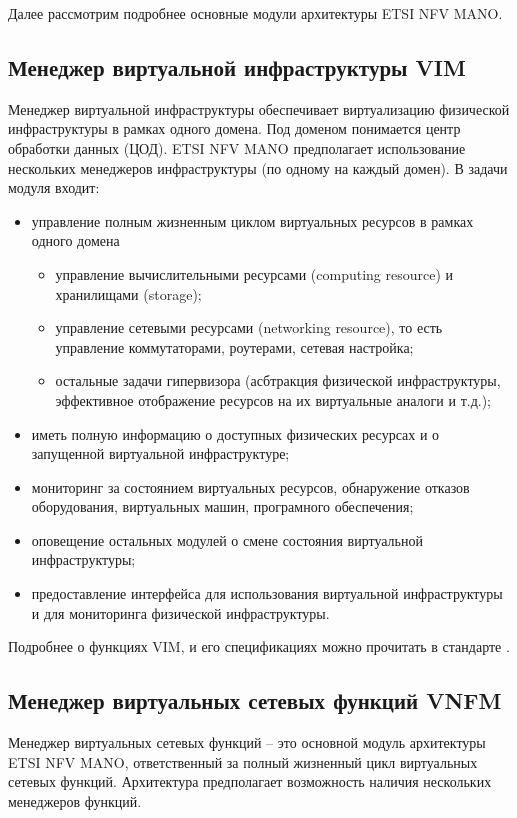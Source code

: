 \documentclass[oneside,final,14pt,a4paper]{extreport}
\begin{document}
Далее рассмотрим подробнее основные модули архитектуры ETSI NFV MANO.

\subsection{Менеджер виртуальной инфраструктуры VIM}
Менеджер виртуальной инфраструктуры обеспечивает виртуализацию физической инфраструктуры в рамках одного домена. Под доменом понимается центр обработки данных (ЦОД). ETSI NFV MANO предполагает использование нескольких менеджеров инфраструктуры (по одному на каждый домен). В задачи модуля входит:

\begin{itemize}
	\item управление полным жизненным циклом виртуальных ресурсов в рамках одного домена
	\begin{itemize}
		\item управление вычислительными ресурсами (computing resource) и хранилищами (storage);
		\item управление сетевыми ресурсами (networking resource), то есть управление коммутаторами, роутерами, сетевая настройка;
		\item остальные задачи гипервизора (асбтракция физической инфраструктуры, эффективное отображение ресурсов на их виртуальные аналоги и т.д.);
	\end{itemize}
	\item иметь полную информацию о доступных физических ресурсах и о запущенной виртуальной инфраструктуре;
	\item мониторинг за состоянием виртуальных ресурсов, обнаружение отказов оборудования, виртуальных машин, програмного обеспечения;
	\item оповещение остальных модулей о смене состояния виртуальной инфраструктуры;
	\item предоставление интерфейса для использования виртуальной инфраструктуры и для мониторинга физической инфраструктуры.
\end{itemize}

Подробнее о функциях VIM, и его спецификациях можно прочитать в стандарте \cite{nfv-mano-official-2016-04}.

\subsection{Менеджер виртуальных сетевых функций VNFM}
Менеджер виртуальных сетевых функций -- это основной модуль архитектуры ETSI NFV MANO, ответственный за  полный жизненный цикл виртуальных сетевых функций. Архитектура предполагает возможность наличия нескольких менеджеров функций.
\end{document}

